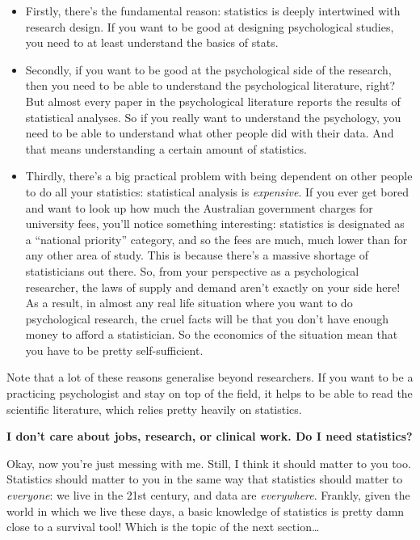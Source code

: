 \documentclass[]{book}
\providecommand{\tightlist}{%
  \setlength{\itemsep}{0pt}\setlength{\parskip}{0pt}}
\begin{document}
\begin{itemize}
\tightlist
\item
  Firstly, there's the fundamental reason: statistics is deeply intertwined with research design. If you want to be good at designing psychological studies, you need to at least understand the basics of stats.
\item
  Secondly, if you want to be good at the psychological side of the research, then you need to be able to understand the psychological literature, right? But almost every paper in the psychological literature reports the results of statistical analyses. So if you really want to understand the psychology, you need to be able to understand what other people did with their data. And that means understanding a certain amount of statistics.
\item
  Thirdly, there's a big practical problem with being dependent on other people to do all your statistics: statistical analysis is \emph{expensive}. If you ever get bored and want to look up how much the Australian government charges for university fees, you'll notice something interesting: statistics is designated as a ``national priority'' category, and so the fees are much, much lower than for any other area of study. This is because there's a massive shortage of statisticians out there. So, from your perspective as a psychological researcher, the laws of supply and demand aren't exactly on your side here! As a result, in almost any real life situation where you want to do psychological research, the cruel facts will be that you don't have enough money to afford a statistician. So the economics of the situation mean that you have to be pretty self-sufficient.
\end{itemize}

Note that a lot of these reasons generalise beyond researchers. If you want to be a practicing psychologist and stay on top of the field, it helps to be able to read the scientific literature, which relies pretty heavily on statistics.

\textbf{I don't care about jobs, research, or clinical work. Do I need statistics?}

Okay, now you're just messing with me. Still, I think it should matter to you too. Statistics should matter to you in the same way that statistics should matter to \emph{everyone}: we live in the 21st century, and data are \emph{everywhere}. Frankly, given the world in which we live these days, a basic knowledge of statistics is pretty damn close to a survival tool! Which is the topic of the next section\ldots{}
\end{document}
